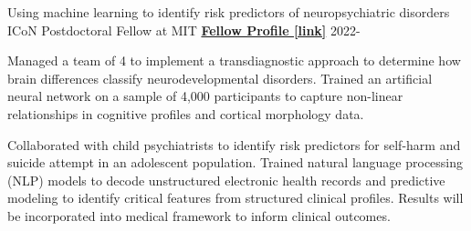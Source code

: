 

\begin{cventries}

  \cventry
    {Using machine learning to identify risk predictors of neuropsychiatric disorders}
    {ICoN Postdoctoral Fellow at MIT} %
    {\href{https://maedbhk.github.io/MIT-Projects/assets/images/ICoN_profile.png}{\textbf{Fellow Profile [link]}}}
    {2022-} %
    {
      \begin{cvitems} %
		\item {Managed a team of 4 to implement a transdiagnostic approach to determine how brain differences classify neurodevelopmental disorders. Trained an artificial neural network on a sample of 4,000 participants to capture non-linear relationships in cognitive profiles and cortical morphology data.}
		\item {Collaborated with child psychiatrists to identify risk predictors for self-harm and suicide attempt in an adolescent population. Trained natural language processing (NLP) models to decode unstructured electronic health records and predictive modeling to identify critical features from structured clinical profiles. Results will be incorporated into medical framework to inform clinical outcomes.}
		\end{cvitems}
    }



\end{cventries}
